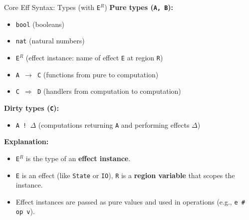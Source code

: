 \begin{frame}{Core Eff Syntax: Types (with \texttt{E$^R$})}
\textbf{Pure types (\texttt{A, B}):}
\begin{itemize}
  \item \texttt{bool} \hfill (booleans)
  \item \texttt{nat} \hfill (natural numbers)
  \item \texttt{E$^R$} \hfill (effect instance: name of effect \texttt{E} at region \texttt{R})
  \item \texttt{A $\rightarrow$ C} \hfill (functions from pure to computation)
  \item \texttt{C $\Rightarrow$ D} \hfill (handlers from computation to computation)
\end{itemize}

\vspace{1em}
\textbf{Dirty types (\texttt{C}):}
\begin{itemize}
  \item \texttt{A ! $\Delta$} \hfill (computations returning \texttt{A} and performing effects $\Delta$)
\end{itemize}

\vspace{1em}
\textbf{Explanation:}
\begin{itemize}
  \item \texttt{E$^R$} is the type of an \textbf{effect instance}.
  \item \texttt{E} is an effect (like \texttt{State} or \texttt{IO}), \texttt{R} is a \textbf{region variable} that scopes the instance.
  \item Effect instances are passed as pure values and used in operations (e.g., \texttt{e \# op v}).
\end{itemize}
\end{frame}

